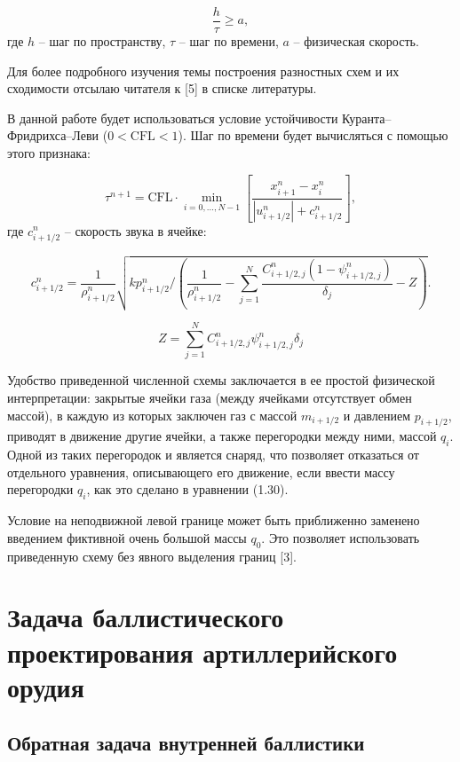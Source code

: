\documentclass[14pt, a4paper]{extreport} %
\begin{document}
\[
\frac{h}{\tau} \geq a,
\]
где \( h \) -- шаг по пространству, \( \tau \) -- шаг по времени, \( a \) -- физическая скорость.

Для более подробного изучения темы построения разностных схем и их сходимости отсылаю читателя к [5] в списке литературы.

В данной работе будет использоваться условие устойчивости Куранта--Фридрихса--Леви (\(0 < \text{CFL} < 1\)). Шаг по времени 
будет вычисляться с помощью этого признака:

\begin{equation}
\tau^{n+1} = \text{CFL} \cdot \min_{i=0,\ldots,N-1} \left[ \frac{x_{i+1}^n - x_i^n}{|u_{i+1/2}^n| + c_{i+1/2}^n} \right],
\end{equation}
где \(c_{i+1/2}^n\) -- скорость звука в ячейке:

\begin{equation}
c_{i+1/2}^n = \frac{1}{\rho_{i+1/2}^n} \sqrt{k p_{i+1/2}^n / \left( \frac{1}{\rho_{i+1/2}^n} - \sum_{j=1}^N \frac{C_{i+1/2,j}^n (1-\psi_{i+1/2,j}^n)}{\delta_j} - Z \right)}.
\end{equation}

\[
Z = \sum_{j=1}^N C_{i+1/2,j}^n \psi_{i+1/2,j}^n \delta_j 
\]

Удобство приведенной численной схемы заключается в ее простой физической интерпретации: закрытые ячейки газа (между ячейками отсутствует обмен массой), в каждую из которых заключен газ с массой \( m_{i+1/2} \) и давлением \( p_{i+1/2} \), приводят в движение другие ячейки, а также перегородки между ними, массой \( q_i \). Одной из таких перегородок и является снаряд, что позволяет отказаться от отдельного уравнения, описывающего его движение, если ввести массу перегородки \( q_i \), как это сделано в уравнении (1.30). 

Условие на неподвижной левой границе может быть приближенно заменено введением фиктивной очень большой массы \( q_0 \). Это позволяет использовать приведенную схему без явного выделения границ [3].

\chapter{Задача баллистического проектирования артиллерийского орудия}

\section{Обратная задача внутренней баллистики}
\end{document}
